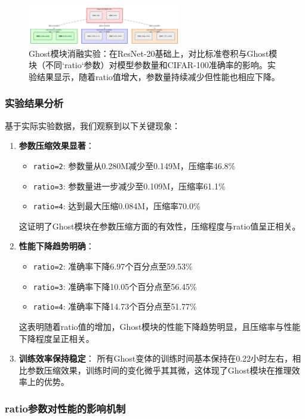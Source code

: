 \documentclass[a4paper]{article}
\begin{document}
\begin{figure}[H]
    \centering
    \includegraphics[width=0.6\textwidth]{fig/1.png}
    \caption{Ghost模块消融实验：在ResNet-20基础上，对比标准卷积与Ghost模块（不同`ratio`参数）对模型参数量和CIFAR-100准确率的影响。实验结果显示，随着ratio值增大，参数量持续减少但性能也相应下降。}
    \label{fig:ghost_ablation_chart}
\end{figure}

\subsubsection{实验结果分析}
基于实际实验数据，我们观察到以下关键现象：
\begin{enumerate}
    \item \textbf{参数压缩效果显著}：
    \begin{itemize}
        \item \texttt{ratio=2}: 参数量从0.280M减少至0.149M，压缩率46.8\%
        \item \texttt{ratio=3}: 参数量进一步减少至0.109M，压缩率61.1\%
        \item \texttt{ratio=4}: 达到最大压缩0.084M，压缩率70.0\%
    \end{itemize}
    这证明了Ghost模块在参数压缩方面的有效性，压缩程度与ratio值呈正相关。
    \item \textbf{性能下降趋势明确}：
    \begin{itemize}
        \item \texttt{ratio=2}: 准确率下降6.97个百分点至59.53\%
        \item \texttt{ratio=3}: 准确率下降10.05个百分点至56.45\%
        \item \texttt{ratio=4}: 准确率下降14.73个百分点至51.77\%
    \end{itemize}
    这表明随着ratio值的增加，Ghost模块的性能下降趋势明显，且压缩率与性能下降程度呈正相关。
    \item \textbf{训练效率保持稳定}：
    所有Ghost变体的训练时间基本保持在0.22小时左右，相比参数压缩效果，训练时间的变化微乎其其微，这体现了Ghost模块在推理效率上的优势。
\end{enumerate}

\subsubsection{ratio参数对性能的影响机制}
\end{document}
